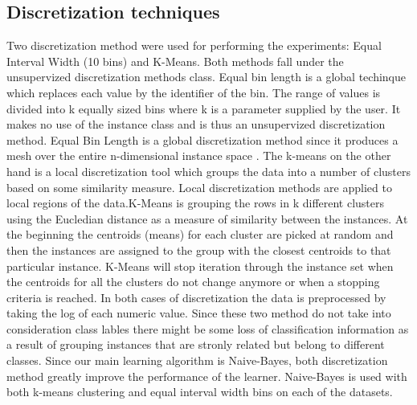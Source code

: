 \documentclass{sig-alternate}
\begin{document}
\subsection{Discretization techniques}
Two discretization method were used for performing the experiments: Equal Interval Width (10 bins) and K-Means. Both methods fall under the unsupervized discretization methods class. Equal bin length is a global techinque which replaces each value by the identifier of the bin. The range of values is divided into k equally sized bins where k is a parameter supplied by the user. It makes no use of the instance class and is thus an unsupervized discretization method. Equal Bin Length is a global discretization  method since it produces a mesh over the entire n-dimensional instance space \cite {dough95}. The k-means on the other hand is a local discretization tool which groups the data into a number of clusters based on some similarity measure. Local discretization methods are applied to local regions of the data.K-Means is grouping the rows in k different clusters using the Eucledian distance as a measure of similarity between the instances. At the beginning the centroids (means) for each cluster are picked at random and then the instances are assigned to the group with the closest centroids to that particular instance. K-Means will stop iteration through the instance set when the centroids for all the clusters do not change anymore or when a stopping criteria is reached. In both cases of discretization the data is preprocessed by taking the log of each numeric value. Since these two method do not take into consideration class lables there might be some loss of classification information as a result of grouping instances that are stronly related but belong to different classes. 
Since our main learning algorithm is Naive-Bayes, both discretization method greatly improve the performance of the learner. Naive-Bayes is used with both k-means clustering and equal interval width bins on each of the datasets.
\end{document}
